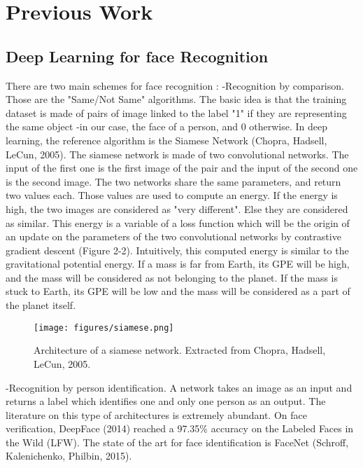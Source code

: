 \section{Previous Work}
\subsection{Deep Learning for face Recognition}
There are two main schemes for face recognition :\newline
-Recognition by comparison. Those are the "Same/Not Same" algorithms. The basic idea is that the training dataset is made of pairs of image linked to the label "1" if they are representing the same object -in our case, the face of a person, and 0 otherwise. In deep learning, the reference algorithm is the Siamese Network (Chopra, Hadsell, LeCun, 2005). The siamese network is made of two convolutional networks. The input of the first one is the first image of the pair and the input of the second one is the second image. The two networks share the same parameters, and return two values each. Those values are used to compute an energy. If the energy is high, the two images are considered as "very different". Else they are considered as similar. This energy is a variable of a loss function which will be the origin of an update on the parameters of the two convolutional networks by contrastive gradient descent (Figure 2-2). Intuitively, this computed energy is similar to the gravitational potential energy. If a mass is far from Earth, its GPE will be high, and the mass will be considered as not belonging to the planet. If the mass is stuck to Earth, its GPE will be low and the mass will be considered as a part of the planet itself.


\begin{figure}[t]
  \centering
  \texttt{[image: figures/siamese.png]}  
  \caption[Architecture of a siamese network. Extracted from Chopra, Hadsell, LeCun, 2005.]{Architecture of a siamese network. Extracted from Chopra, Hadsell, LeCun, 2005.}
  \label{fig:Siamese}
\end{figure}

-Recognition by person identification. A network takes an image as an input and returns a label which identifies one and only one person as an output. The literature on this type of architectures is extremely abundant. On face verification, DeepFace (2014) reached a 97.35\% accuracy on the Labeled Faces in the Wild (LFW). The state of the art for face identification is FaceNet (Schroff, Kalenichenko, Philbin, 2015).

